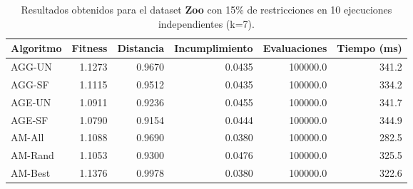 \begin{table}[H]
    \centering
    \begin{tabular}{lrrrrr}
        \hline
        Algoritmo & Fitness & Distancia & Incumplimiento & Evaluaciones & Tiempo (ms)\\
        \hline
        AGG-UN & 1.1273 & 0.9670 & 0.0435 & 100000.0 & 341.2 \\
        AGG-SF & 1.1115 & 0.9512 & 0.0435 & 100000.0 & 334.2 \\
        AGE-UN & 1.0911 & 0.9236 & 0.0455 & 100000.0 & 341.7 \\
        AGE-SF & 1.0790 & 0.9154 & 0.0444 & 100000.0 & 344.9 \\
        AM-All & 1.1088 & 0.9690 & 0.0380 & 100000.0 & 282.5 \\
        AM-Rand & 1.1053 & 0.9300 & 0.0476 & 100000.0 & 325.5 \\
        AM-Best & 1.1376 & 0.9978 & 0.0380 & 100000.0 & 322.6 \\
        \hline
    \end{tabular}
    \caption{Resultados obtenidos para el dataset \textbf{Zoo} con 15\% de restricciones en  10 ejecuciones independientes (k=7).}
    \label{tab:res_zoo_15}
\end{table}